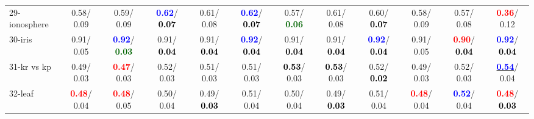 \begin{table}[h]
\begin{center}
{\begin{tabular}{lc|c|c|c|c|c|c|c|c|c|c}
29-ionosphere &   0.58/  0.09 &   0.59/  0.09 & \textcolor{blue}{\textbf{  0.62}}/\textcolor{black}{\textbf{  0.07}} &   0.61/  0.08 & \textcolor{blue}{\textbf{  0.62}}/\textcolor{black}{\textbf{  0.07}} &   0.57/\textcolor{darkgreen}{\textbf{  0.06}} &   0.61/  0.08 &   0.60/\textcolor{black}{\textbf{  0.07}} &   0.58/  0.09 &   0.57/  0.08 & \textcolor{red}{\textbf{  0.36}}/  0.12 \\
30-iris &   0.91/  0.05 & \textcolor{blue}{\textbf{  0.92}}/\textcolor{darkgreen}{\textbf{  0.03}} &   0.91/\textcolor{black}{\textbf{  0.04}} &   0.91/\textcolor{black}{\textbf{  0.04}} & \textcolor{blue}{\textbf{  0.92}}/\textcolor{black}{\textbf{  0.04}} &   0.91/\textcolor{black}{\textbf{  0.04}} &   0.91/\textcolor{black}{\textbf{  0.04}} & \textcolor{blue}{\textbf{  0.92}}/\textcolor{black}{\textbf{  0.04}} &   0.91/  0.05 & \textcolor{red}{\textbf{  0.90}}/\textcolor{black}{\textbf{  0.04}} & \textcolor{blue}{\textbf{  0.92}}/\textcolor{black}{\textbf{  0.04}} \\
31-kr vs kp &   0.49/  0.03 & \textcolor{red}{\textbf{  0.47}}/  0.03 &   0.52/  0.03 &   0.51/  0.03 &   0.51/  0.03 & \textcolor{black}{\textbf{  0.53}}/  0.03 & \textcolor{black}{\textbf{  0.53}}/  0.03 &   0.52/\textcolor{black}{\textbf{  0.02}} &   0.49/  0.03 &   0.52/  0.03 & \underline{\textcolor{blue}{\textbf{  0.54}}}/  0.04 \\
32-leaf & \textcolor{red}{\textbf{  0.48}}/  0.04 & \textcolor{red}{\textbf{  0.48}}/  0.05 &   0.50/  0.04 &   0.49/\textcolor{black}{\textbf{  0.03}} &   0.51/  0.04 &   0.50/  0.04 &   0.49/\textcolor{black}{\textbf{  0.03}} &   0.51/  0.04 & \textcolor{red}{\textbf{  0.48}}/  0.04 & \textcolor{blue}{\textbf{  0.52}}/  0.04 & \textcolor{red}{\textbf{  0.48}}/\textcolor{black}{\textbf{  0.03}} \\\end{tabular}}\label{stratsALCKappa0a5NNRedux}
\end{center}
\end{table}
